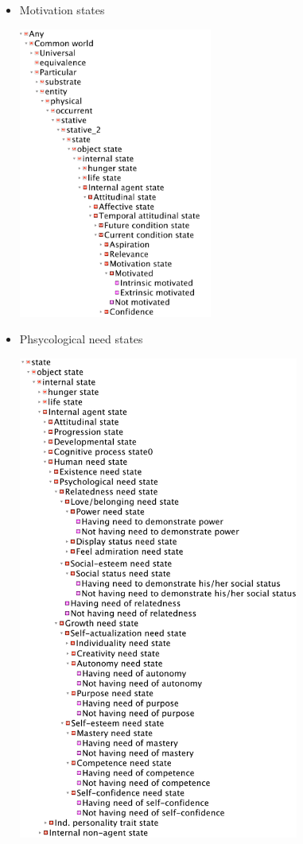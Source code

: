 


\begin{itemize}

\item Motivation states

\includegraphics[width=0.5\textwidth]{images/appendix/tree-overview-motivation-states.png} \newpage

\item Phsycological need states

\includegraphics[width=0.725\textwidth]{images/appendix/tree-overview-need-states.png} \newpage


\end{itemize}
